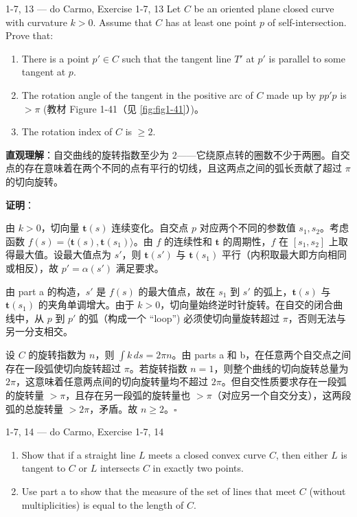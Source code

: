\begin{exercise}{1-7, 13 — do Carmo, Exercise 1-7, 13}
Let $C$ be an oriented plane closed curve with curvature $k > 0$. Assume that $C$ has at least one point $p$ of self-intersection. Prove that:
\begin{enumerate}
\item[a.] There is a point $p' \in C$ such that the tangent line $T'$ at $p'$ is parallel to some tangent at $p$.
\item[b.] The rotation angle of the tangent in the positive arc of $C$ made up by $pp'p$ is $> \pi$ (教材 Figure 1-41（见 \cref{fig:fig1-41}）)。
\item[c.] The rotation index of $C$ is $\geq 2$.
\end{enumerate}
\end{exercise}

\begin{solution}
\textbf{直观理解}：自交曲线的旋转指数至少为 $2$——它绕原点转的圈数不少于两圈。自交点的存在意味着在两个不同的点有平行的切线，且这两点之间的弧长贡献了超过 $\pi$ 的切向旋转。

\textbf{证明}：
\item[a.] 由 $k > 0$，切向量 $\mathbf{t}(s)$ 连续变化。自交点 $p$ 对应两个不同的参数值 $s_1, s_2$。考虑函数 $f(s) = \langle \mathbf{t}(s), \mathbf{t}(s_1) \rangle$。由 $f$ 的连续性和 $\mathbf{t}$ 的周期性，$f$ 在 $[s_1, s_2]$ 上取得最大值。设最大值点为 $s'$，则 $\mathbf{t}(s')$ 与 $\mathbf{t}(s_1)$ 平行（内积取最大即方向相同或相反），故 $p' = \alpha(s')$ 满足要求。

\item[b.] 由 part a 的构造，$s'$ 是 $f(s)$ 的最大值点，故在 $s_1$ 到 $s'$ 的弧上，$\mathbf{t}(s)$ 与 $\mathbf{t}(s_1)$ 的夹角单调增大。由于 $k > 0$，切向量始终逆时针旋转。在自交的闭合曲线中，从 $p$ 到 $p'$ 的弧（构成一个 ``loop'') 必须使切向量旋转超过 $\pi$，否则无法与另一分支相交。

\item[c.] 设 $C$ 的旋转指数为 $n$，则 $\int k \, ds = 2\pi n$。由 parts a 和 b，在任意两个自交点之间存在一段弧使切向旋转超过 $\pi$。若旋转指数 $n = 1$，则整个曲线的切向旋转总量为 $2\pi$，这意味着任意两点间的切向旋转量均不超过 $2\pi$。但自交性质要求存在一段弧的旋转量 $> \pi$，且存在另一段弧的旋转量也 $> \pi$（对应另一个自交分支），这两段弧的总旋转量 $> 2\pi$，矛盾。故 $n \geq 2$。$\square$
\end{solution}

\begin{exercise}{1-7, 14 — do Carmo, Exercise 1-7, 14}
\begin{enumerate}
\item[a.] Show that if a straight line $L$ meets a closed convex curve $C$, then either $L$ is tangent to $C$ or $L$ intersects $C$ in exactly two points.
\item[b.] Use part a to show that the measure of the set of lines that meet $C$ (without multiplicities) is equal to the length of $C$.
\end{enumerate}
\end{exercise}

